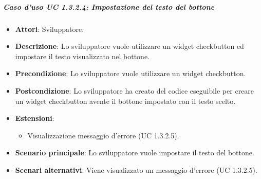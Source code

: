 \subparagraph{Caso d'uso UC 1.3.2.4: Impostazione del testo del bottone}
\FloatBarrier
\begin{itemize}
\item\textbf{Attori}: Sviluppatore.
\item\textbf{Descrizione}: Lo sviluppatore vuole utilizzare un widget checkbutton ed impostare il testo visualizzato nel bottone.
\item\textbf{Precondizione}: Lo sviluppatore vuole utilizzare un widget checkbutton.
\item\textbf{Postcondizione}: Lo sviluppatore ha creato del codice eseguibile per creare un widget checkbutton avente il bottone impostato con il testo scelto.
\item \textbf{Estensioni}: 
\begin{itemize}
\item Visualizzazione messaggio d'errore (UC 1.3.2.5).
\end{itemize}
\item \textbf{Scenario principale}: Lo sviluppatore vuole impostare il testo del bottone.
\item \textbf{Scenari alternativi}: Viene visualizzato un messaggio d'errore (UC 1.3.2.5).
\end{itemize}